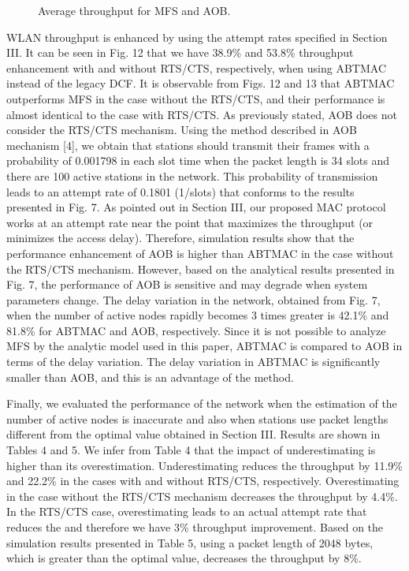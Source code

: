 \documentclass[10pt,twocolumn,oneside,submit]{JCNtran}
\begin{document}
\begin{figure}[!t]
\begin{center}
\epsfxsize=8cm \leavevmode{} \caption{Average throughput for MFS and AOB.} \label{fig:13}
\end{center}
\end{figure}
\par WLAN throughput is enhanced by using the attempt rates specified in Section III. It can be seen in Fig. 12 that we have 38.9\% and 53.8\% throughput enhancement with and without RTS/CTS, respectively, when using ABTMAC instead of the legacy DCF. It is observable from Figs. 12 and 13 that ABTMAC outperforms MFS in the case without the RTS/CTS, and their performance is almost identical to the case with RTS/CTS. As previously stated, AOB does not consider the RTS/CTS mechanism. Using the method described in AOB mechanism [4], we obtain that stations should transmit their frames with a probability of 0.001798 in each slot time when the packet length is 34 slots and there are 100 active stations in the network. This probability of transmission leads to an attempt rate of 0.1801 (1/slots) that conforms to the results presented in Fig. 7. As pointed out in Section III, our proposed MAC protocol works at an attempt rate near the point that maximizes the throughput (or minimizes the access delay). Therefore, simulation results show that the performance enhancement of AOB is higher than ABTMAC in the case without the RTS/CTS mechanism. However, based on the analytical results presented in Fig. 7, the performance of AOB is sensitive and may degrade when system parameters change. The delay variation in the network, obtained from Fig. 7, when the number of active nodes rapidly becomes 3 times greater is 42.1\% and 81.8\% for ABTMAC and AOB, respectively. Since it is not possible to analyze MFS by the analytic model used in this paper, ABTMAC is compared to AOB in terms of the delay variation. The delay variation in ABTMAC is significantly smaller than AOB, and this is an advantage of the method.
\par Finally, we evaluated the performance of the network when the estimation of the number of active nodes is inaccurate and also when stations use packet lengths different from the optimal value obtained in Section III. Results are shown in Tables 4 and 5. We infer from Table 4 that the impact of underestimating  is higher than its overestimation. Underestimating  reduces the throughput by 11.9\% and 22.2\% in the cases with and without RTS/CTS, respectively. Overestimating  in the case without the RTS/CTS mechanism decreases the throughput by 4.4\%. In the RTS/CTS case, overestimating  leads to an actual attempt rate that reduces the  and therefore we have 3\% throughput improvement. Based on the simulation results presented in Table 5, using a packet length of 2048 bytes, which is greater than the optimal value, decreases the throughput by 8\%.
\end{document}

